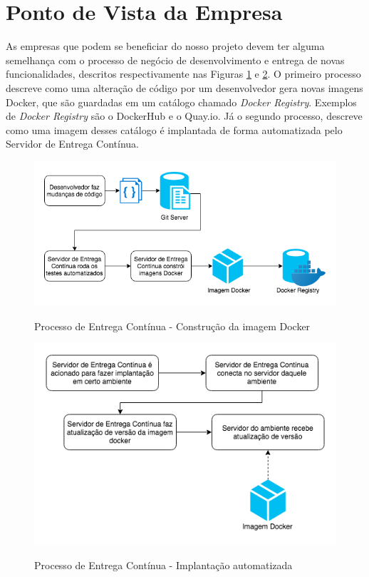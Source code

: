 	\section{Ponto de Vista da Empresa}
	    As empresas que podem se beneficiar do nosso projeto devem ter alguma semelhança com o processo de negócio de desenvolvimento e entrega de novas funcionalidades, descritos respectivamente nas Figuras \ref{fig:build-ci} e \ref{fig:automated-deploy}. O primeiro processo descreve como uma alteração de código por um desenvolvedor gera novas imagens Docker, que são guardadas em um catálogo chamado \textit{Docker Registry}. Exemplos de \textit{Docker Registry} são o DockerHub e o Quay.io. Já o segundo processo, descreve como uma imagem desses catálogo é implantada de forma automatizada pelo Servidor de Entrega Contínua.
	    \begin{figure}[htb]
    	    \centering
    	    \caption{Processo de Entrega Contínua - Construção da imagem Docker}
    	    \includegraphics[scale=0.7]{pictures/especificacao-de-requisitos/build-ci.png}
    	    \label{fig:build-ci}
	    \end{figure}
	    \begin{figure}[htb]
    	    \centering
    	    \caption{Processo de Entrega Contínua - Implantação automatizada}
    	    \includegraphics[scale=0.7]{pictures/especificacao-de-requisitos/automated-deploy.png}
    	    \label{fig:automated-deploy}
	    \end{figure}
